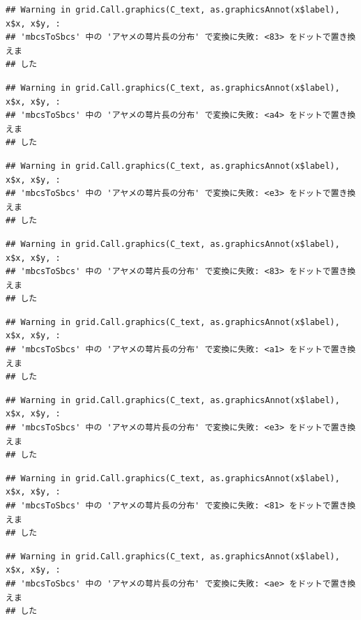\documentclass[
]{book}
\begin{document}
\begin{verbatim}
## Warning in grid.Call.graphics(C_text, as.graphicsAnnot(x$label), x$x, x$y, :
## 'mbcsToSbcs' 中の 'アヤメの萼片長の分布' で変換に失敗: <83> をドットで置き換えま
## した
\end{verbatim}

\begin{verbatim}
## Warning in grid.Call.graphics(C_text, as.graphicsAnnot(x$label), x$x, x$y, :
## 'mbcsToSbcs' 中の 'アヤメの萼片長の分布' で変換に失敗: <a4> をドットで置き換えま
## した
\end{verbatim}

\begin{verbatim}
## Warning in grid.Call.graphics(C_text, as.graphicsAnnot(x$label), x$x, x$y, :
## 'mbcsToSbcs' 中の 'アヤメの萼片長の分布' で変換に失敗: <e3> をドットで置き換えま
## した
\end{verbatim}

\begin{verbatim}
## Warning in grid.Call.graphics(C_text, as.graphicsAnnot(x$label), x$x, x$y, :
## 'mbcsToSbcs' 中の 'アヤメの萼片長の分布' で変換に失敗: <83> をドットで置き換えま
## した
\end{verbatim}

\begin{verbatim}
## Warning in grid.Call.graphics(C_text, as.graphicsAnnot(x$label), x$x, x$y, :
## 'mbcsToSbcs' 中の 'アヤメの萼片長の分布' で変換に失敗: <a1> をドットで置き換えま
## した
\end{verbatim}

\begin{verbatim}
## Warning in grid.Call.graphics(C_text, as.graphicsAnnot(x$label), x$x, x$y, :
## 'mbcsToSbcs' 中の 'アヤメの萼片長の分布' で変換に失敗: <e3> をドットで置き換えま
## した
\end{verbatim}

\begin{verbatim}
## Warning in grid.Call.graphics(C_text, as.graphicsAnnot(x$label), x$x, x$y, :
## 'mbcsToSbcs' 中の 'アヤメの萼片長の分布' で変換に失敗: <81> をドットで置き換えま
## した
\end{verbatim}

\begin{verbatim}
## Warning in grid.Call.graphics(C_text, as.graphicsAnnot(x$label), x$x, x$y, :
## 'mbcsToSbcs' 中の 'アヤメの萼片長の分布' で変換に失敗: <ae> をドットで置き換えま
## した
\end{verbatim}
\end{document}
